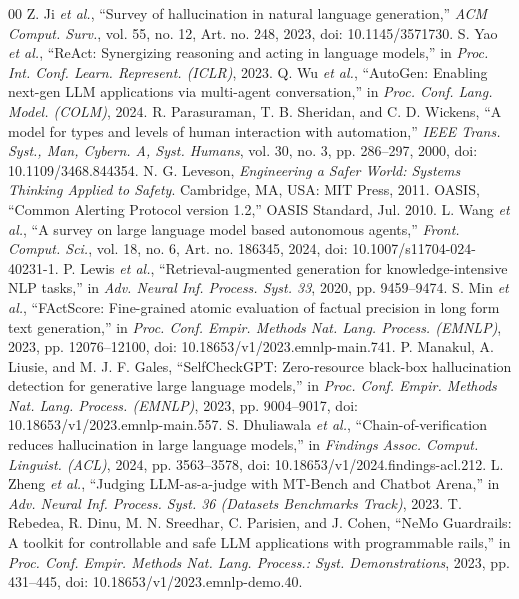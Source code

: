 \documentclass[conference]{IEEEtran}
\begin{document}
\balance
\begin{thebibliography}{00}
 Z. Ji \textit{et al.}, ``Survey of hallucination in natural language generation,'' \textit{ACM Comput. Surv.}, vol. 55, no. 12, Art. no. 248, 2023, doi: 10.1145/3571730.
 S. Yao \textit{et al.}, ``ReAct: Synergizing reasoning and acting in language models,'' in \textit{Proc. Int. Conf. Learn. Represent. (ICLR)}, 2023.
 Q. Wu \textit{et al.}, ``AutoGen: Enabling next-gen LLM applications via multi-agent conversation,'' in \textit{Proc. Conf. Lang. Model. (COLM)}, 2024.
 R. Parasuraman, T. B. Sheridan, and C. D. Wickens, ``A model for types and levels of human interaction with automation,'' \textit{IEEE Trans. Syst., Man, Cybern. A, Syst. Humans}, vol. 30, no. 3, pp. 286--297, 2000, doi: 10.1109/3468.844354.
 N. G. Leveson, \textit{Engineering a Safer World: Systems Thinking Applied to Safety}. Cambridge, MA, USA: MIT Press, 2011.
 OASIS, ``Common Alerting Protocol version 1.2,'' OASIS Standard, Jul. 2010.
 L. Wang \textit{et al.}, ``A survey on large language model based autonomous agents,'' \textit{Front. Comput. Sci.}, vol. 18, no. 6, Art. no. 186345, 2024, doi: 10.1007/s11704-024-40231-1.
 P. Lewis \textit{et al.}, ``Retrieval-augmented generation for knowledge-intensive NLP tasks,'' in \textit{Adv. Neural Inf. Process. Syst. 33}, 2020, pp. 9459--9474.
 S. Min \textit{et al.}, ``FActScore: Fine-grained atomic evaluation of factual precision in long form text generation,'' in \textit{Proc. Conf. Empir. Methods Nat. Lang. Process. (EMNLP)}, 2023, pp. 12076--12100, doi: 10.18653/v1/2023.emnlp-main.741.
 P. Manakul, A. Liusie, and M. J. F. Gales, ``SelfCheckGPT: Zero-resource black-box hallucination detection for generative large language models,'' in \textit{Proc. Conf. Empir. Methods Nat. Lang. Process. (EMNLP)}, 2023, pp. 9004--9017, doi: 10.18653/v1/2023.emnlp-main.557.
 S. Dhuliawala \textit{et al.}, ``Chain-of-verification reduces hallucination in large language models,'' in \textit{Findings Assoc. Comput. Linguist. (ACL)}, 2024, pp. 3563--3578, doi: 10.18653/v1/2024.findings-acl.212.
 L. Zheng \textit{et al.}, ``Judging LLM-as-a-judge with MT-Bench and Chatbot Arena,'' in \textit{Adv. Neural Inf. Process. Syst. 36 (Datasets Benchmarks Track)}, 2023.
 T. Rebedea, R. Dinu, M. N. Sreedhar, C. Parisien, and J. Cohen, ``NeMo Guardrails: A toolkit for controllable and safe LLM applications with programmable rails,'' in \textit{Proc. Conf. Empir. Methods Nat. Lang. Process.: Syst. Demonstrations}, 2023, pp. 431--445, doi: 10.18653/v1/2023.emnlp-demo.40.

\end{thebibliography}
\end{document}
